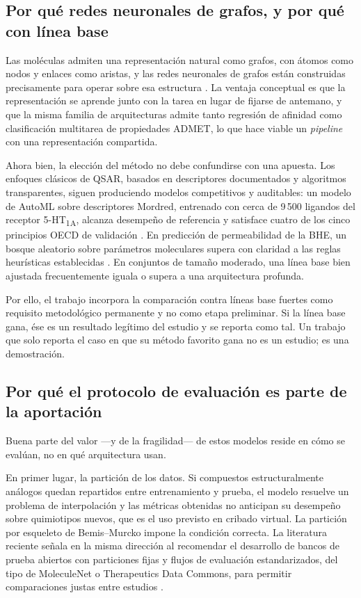 \subsection{Por qué redes neuronales de grafos, y por qué con línea base}
\label{sec:just-gnn}

Las moléculas admiten una representación natural como grafos, con átomos como
nodos y enlaces como aristas, y las redes neuronales de grafos están construidas
precisamente para operar sobre esa estructura \cite{mao_artificial_2026}. La ventaja
conceptual es que la representación se aprende junto con la tarea en lugar de
fijarse de antemano, y que la misma familia de arquitecturas admite tanto
regresión de afinidad como clasificación multitarea de propiedades ADMET, lo
que hace viable un \textit{pipeline} con una representación compartida.

Ahora bien, la elección del método no debe confundirse con una apuesta. Los
enfoques clásicos de QSAR, basados en descriptores documentados y algoritmos
transparentes, siguen produciendo modelos competitivos y auditables: un modelo
de AutoML sobre descriptores Mordred, entrenado con cerca de 9\,500 ligandos del
receptor 5-HT\textsubscript{1A}, alcanza desempeño de referencia y satisface
cuatro de los cinco principios OECD de validación \cite{czub_automlbased_2022}. En
predicción de permeabilidad de la BHE, un bosque aleatorio sobre parámetros
moleculares supera con claridad a las reglas heurísticas establecidas
\cite{spielvogel_enhancing_2025a}. En conjuntos de tamaño moderado, una línea base bien
ajustada frecuentemente iguala o supera a una arquitectura profunda.

Por ello, el trabajo incorpora la comparación contra líneas base fuertes como
requisito metodológico permanente y no como etapa preliminar. Si la línea base
gana, ése es un resultado legítimo del estudio y se reporta como tal. Un trabajo
que solo reporta el caso en que su método favorito gana no es un estudio; es una
demostración.

\subsection{Por qué el protocolo de evaluación es parte de la aportación}
\label{sec:just-evaluacion}

Buena parte del valor —y de la fragilidad— de estos modelos reside en cómo se
evalúan, no en qué arquitectura usan.

En primer lugar, la partición de los datos. Si compuestos estructuralmente
análogos quedan repartidos entre entrenamiento y prueba, el modelo resuelve un
problema de interpolación y las métricas obtenidas no anticipan su desempeño
sobre quimiotipos nuevos, que es el uso previsto en cribado virtual. La
partición por esqueleto de Bemis--Murcko impone la condición correcta. La
literatura reciente señala en la misma dirección al recomendar el desarrollo de
bancos de prueba abiertos con particiones fijas y flujos de evaluación
estandarizados, del tipo de MoleculeNet o Therapeutics Data Commons, para
permitir comparaciones justas entre estudios \cite{mao_artificial_2026}.

